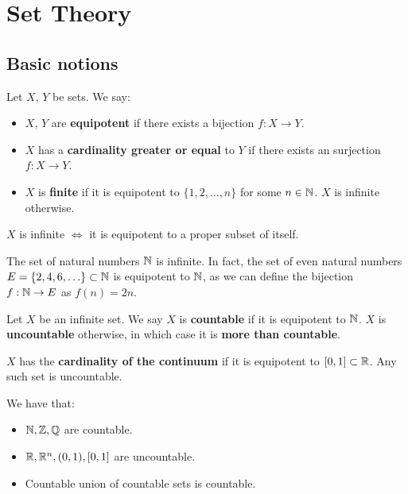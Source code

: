 \chapter{Set Theory}

\section{Basic notions}

\begin{fdefinition}
    Let $X$, $Y$ be sets. We say:
    \begin{itemize}
        \item $X$, $Y$ are \textbf{equipotent} if there exists a bijection
        $f: X \to Y$.

        \item $X$ has a \textbf{cardinality greater or equal} to $Y$ if there exists an
        surjection $f: X \to Y$.

        \item $X$ is \textbf{finite} if it is equipotent to $\{1, 2, \ldots, n\}$
        for some $n \in \mathbb{N}$. $X$ is infinite otherwise.
    \end{itemize}

\end{fdefinition}

\begin{fnote}
    $X$ is infinite $\iff$ it is equipotent to a proper subset of itself.
\end{fnote}

\begin{example}
    The set of natural numbers $\mathbb{N}$ is infinite. In fact, the set of even
    natural numbers $E = \{2, 4, 6, \ldots\} \subset \mathbb{N}$ is equipotent to $\mathbb{N}$, 
    as we can define the bijection $f: \mathbb{N} \to E$ as $f(n) = 2n$.
\end{example}

\begin{fdefinition}
    Let $X$ be an infinite set. We say $X$ is \textbf{countable} if it is
    equipotent to $\mathbb{N}$. $X$ is \textbf{uncountable} otherwise, in which case
    it is \textbf{more than countable}.
\end{fdefinition}

\begin{fdefinition}
    $X$ has the \textbf{cardinality of the continuum} if it is equipotent to
    $[0, 1] \subset \mathbb{R}$. Any such set is uncountable.
\end{fdefinition}

\begin{example}
    We have that:
    \begin{itemize}
        \item $\mathbb{N}, \mathbb{Z}, \mathbb{Q}$ are countable.
        \item $\mathbb{R}, \mathbb{R}^n, (0, 1), [0, 1]$ are uncountable.
        \item Countable union of countable sets is countable.
    \end{itemize}
\end{example}

